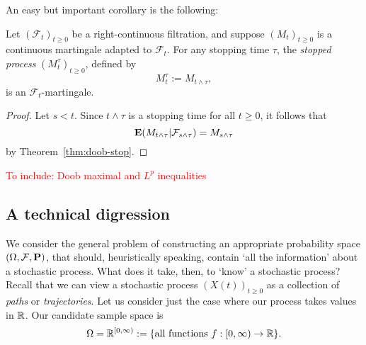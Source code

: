 An easy but important corollary is the following:
\begin{corollary}
\label{cor:mart-is-local}
Let $(\mathcal{F}_t)_{t \ge 0}$ be a right-continuous filtration, and suppose $(M_t)_{t\ge 0}$ is a continuous martingale adapted to $\mathcal{F}_t$. For any stopping time $\tau$, the \emph{stopped process} $(M^\tau_t)_{t\ge 0}$, defined by
\begin{equation*}
    M^\tau_t := M_{t \wedge \tau},
\end{equation*}
is an $\mathcal{F}_t$-martingale.
\end{corollary}

\begin{proof}
Let $s < t$. Since $t\wedge\tau$ is a stopping time for all $t\ge 0$, it follows that
\begin{equation*}
    \mathbf{E}(M_{t\wedge\tau} | \mathcal{F}_{s\wedge\tau}) = M_{s\wedge\tau}
\end{equation*}
by Theorem~\ref{thm:doob-stop}.
\end{proof}

\textcolor{red}{To include: Doob maximal and $L^p$ inequalities}

\subsection{A technical digression}
We consider the general problem of constructing an appropriate probability space $(\Omega,\mathcal{F},\mathbf{P})$, that should, heuristically speaking, contain `all the information' about a stochastic process. What does it take, then, to `know' a stochastic process? Recall that we can view a stochastic process $(X(t))_{t\ge 0}$ as a collection of \emph{paths} or \emph{trajectories}. Let us consider just the case where our process takes values in $\mathbb{R}$. Our candidate sample space is
\begin{equation*}
    \Omega = \mathbb{R}^{[0,\infty)} := \{ \text{all functions } f : [0, \infty) \to\mathbb{R} \}.
\end{equation*}

